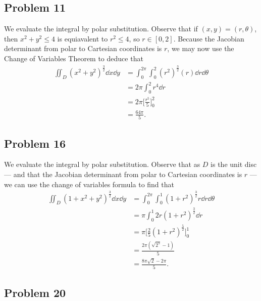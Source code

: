 \documentclass[11pt]{article}
\begin{document}

\subsection*{Problem 11}

We evaluate the integral by polar substitution. Observe that if $(x, y) = (r, \theta)$, then $x^{2} + y^{2} \le 4$ is equiavalent to $r^{2} \le 4$, so $r \in [0, 2]$. Because the Jacobian determinant from polar to Cartesian coordinates is $r$, we may now use the Change of Variables Theorem to deduce that
\begin{align*}
	\iint_{D} (x^{2} + y^{2})^{\tfrac{3}{2}} \dd{x} \dd{y} &= \int_{0}^{2\pi} \int_{0}^{2} \left( r^{2} \right)^{\tfrac{3}{2}} (r) \dd{r} \dd{\theta} \\
	&= 2\pi \int_{0}^{2} r^{4} \dd{r} \\
	&= 2\pi \Big[ \frac{r^{5}}{5} \Big]_{0}^{2} \\
	&= \boxed{\frac{64\pi}{5}}.
\end{align*}


\subsection*{Problem 16}

We evaluate the integral by polar substitution. Observe that as $D$ is the unit disc --- and that the Jacobian determinant from polar to Cartesian coordinates is $r$ --- we can use the change of variables formula to find that
\begin{align*}
	\iint_{D} \left(1 + x^{2} + y^{2} \right)^{\tfrac{3}{2}} \dd{x} \dd{y} &= \int_{0}^{2\pi} \int_{0}^{1} \left( 1 + r^{2} \right)^{\tfrac{3}{2}} r \dd{r} \dd{\theta} \\
	&= \pi \int_{0}^{1} 2r \left( 1 + r^{2} \right)^{\tfrac{3}{2}} \dd{r} \\
	&= \pi \Big[ \frac{2}{5} \left( 1 + r^{2} \right)^{\tfrac{5}{2}} \Big]_{0}^{1} \\
	&= \frac{2\pi(\sqrt{2^{5}} - 1)}{5} \\
	&= \boxed{\frac{8\pi \sqrt{2} - 2\pi}{5}}.
\end{align*}


\subsection*{Problem 20}
\end{document}
